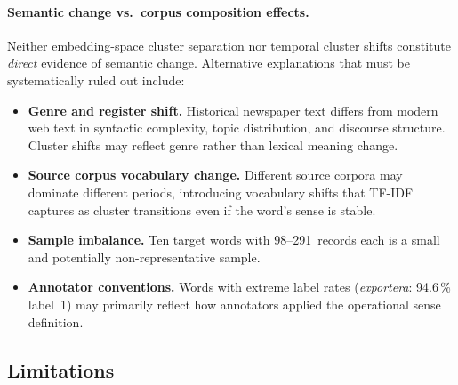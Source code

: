 \paragraph{Semantic change vs.\ corpus composition effects.}
Neither embedding-space cluster separation nor temporal cluster shifts
constitute \emph{direct} evidence of semantic change.  Alternative explanations
that must be systematically ruled out include:
\begin{itemize}
  \item \textbf{Genre and register shift.} Historical newspaper text differs
    from modern web text in syntactic complexity, topic distribution, and
    discourse structure.  Cluster shifts may reflect genre rather than
    lexical meaning change.
  \item \textbf{Source corpus vocabulary change.} Different source corpora
    may dominate different periods, introducing vocabulary shifts that TF-IDF
    captures as cluster transitions even if the word's sense is stable.
  \item \textbf{Sample imbalance.} Ten target words with 98--291~records each
    is a small and potentially non-representative sample.
  \item \textbf{Annotator conventions.} Words with extreme label rates
    (\emph{exportera}: 94.6\,\% label~1) may primarily reflect how annotators
    applied the operational sense definition.
\end{itemize}


\subsection{Limitations}

